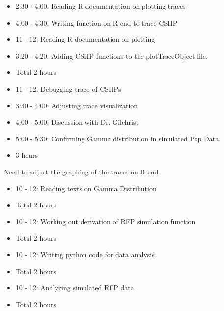 \documentclass[12pt,hyperref]{labbook}
\begin{document}
\begin{itemize}
    \item 2:30 - 4:00: Reading R documentation on plotting traces
    \item 4:00 - 4:30: Writing function on R end to trace CSHP
\end{itemize}
\begin{itemize}
    \item 11 - 12: Reading R documentation on plotting
    \item 3:20 - 4:20: Adding CSHP functions to the plotTraceObject file.
    \item Total 2 hours
\end{itemize}
\begin{itemize}
    \item 11 - 12: Debugging trace of CSHPs
    \item 3:30 - 4:00: Adjusting trace visualization
    \item 4:00 - 5:00: Discussion with Dr. Gilchrist
    \item 5:00 - 5:30: Confirming Gamma distribution in simulated Pop Data.
    \item 3 hours
\end{itemize}
Need to adjust the graphing of the traces on R end
\begin{itemize}
    \item 10 - 12: Reading texts on Gamma Distribution
    \item Total 2 hours
\end{itemize}
\begin{itemize}
    \item 10 - 12: Working out derivation of RFP simulation function.
    \item Total 2 hours
\end{itemize}
\begin{itemize}
    \item 10 - 12: Writing python code for data analysis
    \item Total 2 hours
\end{itemize}
\begin{itemize}
    \item 10 - 12: Analyzing simulated RFP data
    \item Total 2 hours
\end{itemize}
\end{document}
